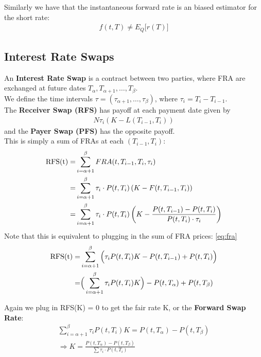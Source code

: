 Similarly we have that the instantaneous forward rate is an 
biased estimator for the short rate:
\begin{align*}
    f(t, T) \neq E_Q\bigl[r(T)\bigr]
\end{align*}

\subsection{Interest Rate Swaps}
\begin{definition}
    An \textbf{Interest Rate Swap} is a contract between two parties, where FRA are exchanged at future dates $T_{\alpha}, T_{\alpha+1}, \dots, T_{\beta}$.\\
    We define the time intervals $\tau = (\tau_{\alpha+1}, \dots, \tau_{\beta})$, where $\tau_i = T_{i} - T_{i-1}$.\\
    The \textbf{Receiver Swap (RFS)} has payoff at each payment date given by
    \begin{align*}
        N \tau_i (K - L(T_{i-1}, T_i))  
    \end{align*}
    and the  \textbf{Payer Swap (PFS)} has the opposite payoff.\\
    This is simply a sum of FRAs at each $(T_{i-1}, T_i)$:
    \begin{align}
        \text{RFS(t)} =& \sum_{i = \alpha + 1}^{\beta} FRA(t, T_{i-1}, T_i, \tau_i) \notag \\
        =& \sum_{i = \alpha + 1}^{\beta} \tau_i \cdot P(t, T_i) \left( K - F(t, T_{i-1}, T_i) \right) \notag\\
        =& \sum_{i = \alpha + 1}^{\beta} \tau_i \cdot P(t, T_i)
        \left( K - \frac{P(t, T_{i-1}) - P(t, T_i)}{P(t, T_i) \cdot \tau_i}\right) \notag
    \end{align}
    Note that this is equivalent to plugging in the sum of FRA prices: \eqref{eq:fra}
    \begin{align}
        \text{RFS(t)}
        =& \sum_{i = \alpha + 1}^{\beta} \Big( \tau_i P(t, T_i) K - P(t, T_{i-1}) + P(t, T_i) \Big) \notag\\
        =& \Big( \sum_{i = \alpha + 1}^{\beta} \tau_i P(t, T_i) K \Big) - P(t, T_{\alpha}) + P(t, T_{\beta}) 
        \label{eq:IRS}
    \end{align}
    
\end{definition}

Again we plug in RFS(K) = 0 to get the fair rate K, or the \textbf{Forward Swap Rate}:
\begin{align*}
    \sum_{i = \alpha + 1}^{\beta} \tau_i P(t, T_i)  K  = P(t, T_{\alpha}) - P(t, T_{\beta})\\
    \Rightarrow K = \frac{P(t, T_{\alpha}) - P(t, T_{\beta})}{\sum \tau_i \cdot P(t, T_i)}
\end{align*}

